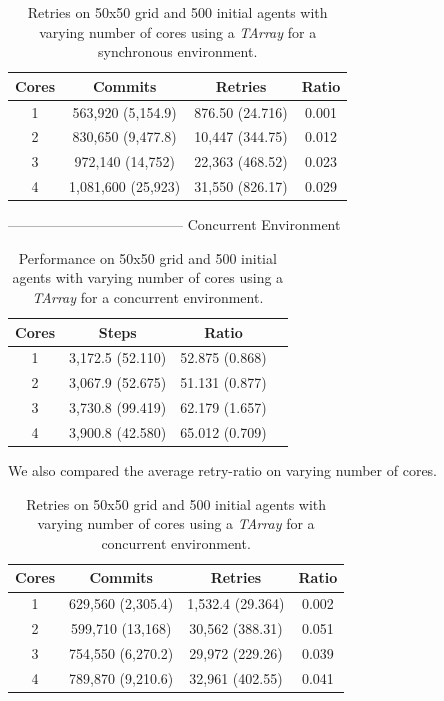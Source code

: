 \begin{table}
	\centering
  	\begin{tabular}{ c || c | c | c }
        Cores & Commits            & Retries         & Ratio \\ \hline \hline 
    	1     & 563,920 (5,154.9)  & 876.50 (24.716) & 0.001 \\ \hline
   		2     & 830,650 (9,477.8)  & 10,447 (344.75) & 0.012 \\ \hline
   		3     & 972,140 (14,752)   & 22,363 (468.52) & 0.023 \\ \hline
   		4     & 1,081,600 (25,923) & 31,550 (826.17) & 0.029 \\ \hline
   	\end{tabular}
  	
  	\caption{Retries on 50x50 grid and 500 initial agents with varying number of cores using a \textit{TArray} for a synchronous environment.}
	\label{tab:tarray_results_syncenv_retries}
\end{table}

--------------------------------------
Concurrent Environment

\begin{table}
	\centering
  	\begin{tabular}{ c || c | c | c }
        Cores & Steps            & Ratio          \\ \hline \hline 
    	1     & 3,172.5 (52.110) & 52.875 (0.868) \\ \hline
   		2     & 3,067.9 (52.675) & 51.131 (0.877) \\ \hline
   		3     & 3,730.8 (99.419) & 62.179 (1.657) \\ \hline
   		4     & 3,900.8 (42.580) & 65.012 (0.709) \\ \hline \hline
   	\end{tabular}
  	
  	\caption{Performance on 50x50 grid and 500 initial agents with varying number of cores using a \textit{TArray} for a concurrent environment.}
	\label{tab:tarray_results_concenv_time}
\end{table}

We also compared the average retry-ratio on varying number of cores.

\begin{table}
	\centering
  	\begin{tabular}{ c || c | c | c }
        Cores & Commits           & Retries          & Ratio \\ \hline \hline 
   		1     & 629,560 (2,305.4) & 1,532.4 (29.364) & 0.002 \\ \hline
    	2     & 599,710 (13,168)  & 30,562 (388.31)  & 0.051 \\ \hline
   		3     & 754,550 (6,270.2) & 29,972 (229.26)  & 0.039 \\ \hline
   		4     & 789,870 (9,210.6) & 32,961 (402.55)  & 0.041 \\ \hline
   	\end{tabular}
  	
  	\caption{Retries on 50x50 grid and 500 initial agents with varying number of cores using a \textit{TArray} for a concurrent environment.}
	\label{tab:tarray_naive_results_concenv_retries}
\end{table}

